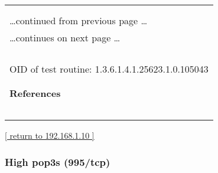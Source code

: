 \documentclass{article}
\begin{document}
\begin{longtable}{|p{}|}
\hline
\rowcolor{openvas_hole}{\color{white}{High (CVSS: 6.8) }}\\
\rowcolor{openvas_hole}{\color{white}{NVT: OpenSSL CCS Man in the Middle Security Bypass Vulnerability (STARTTLS Check)}}\\
\hline
\endfirsthead
\hfill\ldots continued from previous page \ldots \\
\hline
\endhead
\hline
\ldots continues on next page \ldots \\
\endfoot
\hline
\endlastfoot
\\
\rowcolor{white}{\verb==}\\
\rowcolor{white}{\verb==}\\
\\
OID of test routine: 1.3.6.1.4.1.25623.1.0.105043\\
\\

      \hline
      \\
\textbf{References}\\
\rowcolor{white}{\verb=CVE: CVE-2014-0224=}\\
\rowcolor{white}{\verb=BID:67899=}\\
\rowcolor{white}{\verb=Other:=}\\
\rowcolor{white}{\verb=  URL:http://www.securityfocus.com/bid/67899=}\\
\rowcolor{white}{\verb=   URL:http://openssl.org/=}\\
\end{longtable}

\begin{footnotesize}\hyperref[host:192.168.1.10]{[ return to 192.168.1.10 ]}\end{footnotesize}
\subsubsection{High pop3s (995/tcp)}
\label{port:192.168.1.10 pop3s (995/tcp) High}
\end{document}
